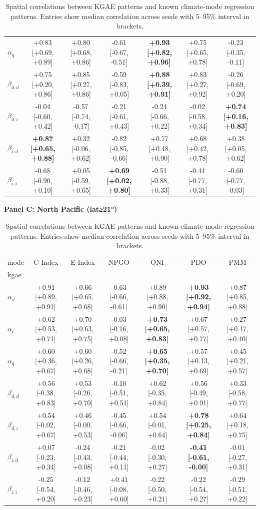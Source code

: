 \begin{table}[t]
\begin{tabular}{lcccccc}
$\alpha_{q}$ & +0.83 [+0.69, +0.89] & +0.80 [+0.68, +0.86] & -0.61 [-0.67, -0.51] & \textbf{+0.93 [+0.82, +0.96]} & +0.75 [+0.65, +0.78] & -0.23 [-0.35, -0.11] \\
$\beta_{d,d}$ & +0.75 [+0.20, +0.86] & +0.85 [+0.27, +0.86] & -0.59 [-0.83, +0.05] & \textbf{+0.88 [+0.39, +0.91]} & +0.83 [+0.27, +0.92] & -0.26 [-0.69, +0.20] \\
$\beta_{d,i}$ & -0.04 [-0.60, +0.42] & -0.57 [-0.74, -0.17] & -0.21 [-0.61, +0.43] & -0.24 [-0.66, +0.22] & -0.02 [-0.58, +0.34] & \textbf{+0.74 [+0.16, +0.83]} \\
$\beta_{i,d}$ & \textbf{+0.87 [+0.65, +0.88]} & +0.32 [-0.06, +0.62] & -0.82 [-0.85, -0.66] & +0.77 [+0.48, +0.90] & +0.68 [+0.42, +0.78] & +0.38 [+0.05, +0.62] \\
$\beta_{i,i}$ & -0.68 [-0.90, +0.10] & +0.05 [-0.59, +0.65] & \textbf{+0.69 [+0.02, +0.80]} & -0.51 [-0.88, +0.33] & -0.44 [-0.77, +0.31] & -0.60 [-0.77, -0.03] \\
\bottomrule
\end{tabular}
\vspace{0.6em}
\textbf{Panel C: North Pacific (lat≥21°)}\\
\begin{tabular}{lcccccc}
\toprule
mode & C-Index & E-Index & NPGO & ONI & PDO & PMM \\
kgae &  &  &  &  &  &  \\
\midrule
$\alpha_{d}$ & +0.91 [+0.89, +0.91] & +0.66 [+0.65, +0.68] & -0.63 [-0.66, -0.61] & +0.89 [+0.88, +0.90] & \textbf{+0.93 [+0.92, +0.94]} & +0.87 [+0.85, +0.88] \\
$\alpha_{i}$ & +0.62 [+0.53, +0.71] & +0.70 [+0.63, +0.75] & -0.03 [-0.16, +0.08] & \textbf{+0.73 [+0.65, +0.83]} & +0.67 [+0.57, +0.77] & +0.27 [+0.17, +0.40] \\
$\alpha_{q}$ & +0.60 [+0.36, +0.67] & +0.60 [+0.26, +0.68] & -0.52 [-0.66, -0.21] & \textbf{+0.65 [+0.35, +0.70]} & +0.57 [+0.13, +0.69] & +0.45 [+0.21, +0.57] \\
$\beta_{d,d}$ & +0.56 [-0.38, +0.83] & +0.53 [-0.26, +0.70] & -0.10 [-0.51, +0.51] & +0.62 [-0.35, +0.84] & +0.56 [-0.49, +0.91] & +0.33 [-0.58, +0.77] \\
$\beta_{d,i}$ & +0.54 [-0.02, +0.67] & +0.46 [-0.00, +0.53] & -0.45 [-0.66, -0.06] & +0.54 [-0.01, +0.64] & \textbf{+0.78 [+0.25, +0.84]} & +0.64 [+0.18, +0.75] \\
$\beta_{i,d}$ & +0.07 [-0.23, +0.34] & -0.24 [-0.43, +0.08] & -0.21 [-0.44, +0.11] & -0.02 [-0.30, +0.27] & \textbf{-0.41 [-0.61, -0.00]} & -0.01 [-0.27, +0.31] \\
$\beta_{i,i}$ & -0.25 [-0.54, +0.20] & -0.12 [-0.46, +0.23] & +0.41 [-0.08, +0.60] & -0.22 [-0.50, +0.21] & -0.22 [-0.54, +0.27] & -0.29 [-0.51, +0.22] \\
\bottomrule
\end{tabular}
\vspace{0.6em}
\caption{Spatial correlations between KGAE patterns and known climate-mode regression patterns. Entries show median correlation across seeds with 5--95\% interval in brackets.}
\label{tab:kgae_climate_panels}
\end{table}
